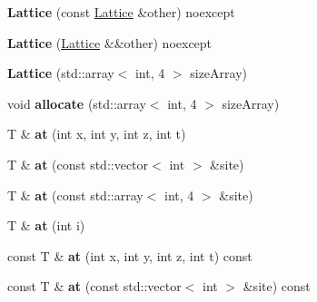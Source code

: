\begin{DoxyCompactItemize}
\item 
{\bfseries Lattice} (const \hyperlink{classLattice}{Lattice} \&other) noexcept\hypertarget{classLattice_a329f8bb4934a16dde20245e5aed1e0f2}{}\label{classLattice_a329f8bb4934a16dde20245e5aed1e0f2}

\item 
{\bfseries Lattice} (\hyperlink{classLattice}{Lattice} \&\&other) noexcept\hypertarget{classLattice_ac515062dd08174cfd300cb7ae82c1131}{}\label{classLattice_ac515062dd08174cfd300cb7ae82c1131}

\item 
{\bfseries Lattice} (std\+::array$<$ int, 4 $>$ size\+Array)\hypertarget{classLattice_a9583bced9172a01d6abb839dc1bea8a4}{}\label{classLattice_a9583bced9172a01d6abb839dc1bea8a4}

\item 
void {\bfseries allocate} (std\+::array$<$ int, 4 $>$ size\+Array)\hypertarget{classLattice_a34d4aba6e3440624d7a78f3de5604bbe}{}\label{classLattice_a34d4aba6e3440624d7a78f3de5604bbe}

\item 
T \& {\bfseries at} (int x, int y, int z, int t)\hypertarget{classLattice_a9345ef22de8cd40304ffaa24bbf84e57}{}\label{classLattice_a9345ef22de8cd40304ffaa24bbf84e57}

\item 
T \& {\bfseries at} (const std\+::vector$<$ int $>$ \&site)\hypertarget{classLattice_a505c50837cfcda18a1f26837ba487d1b}{}\label{classLattice_a505c50837cfcda18a1f26837ba487d1b}

\item 
T \& {\bfseries at} (const std\+::array$<$ int, 4 $>$ \&site)\hypertarget{classLattice_a2885da42d927704c9a465f31d4809302}{}\label{classLattice_a2885da42d927704c9a465f31d4809302}

\item 
T \& {\bfseries at} (int i)\hypertarget{classLattice_a7edbcfba94b2c85c8a73eef6c8b4969c}{}\label{classLattice_a7edbcfba94b2c85c8a73eef6c8b4969c}

\item 
const T \& {\bfseries at} (int x, int y, int z, int t) const \hypertarget{classLattice_a0f68df177d44035f352c097dc59d7b69}{}\label{classLattice_a0f68df177d44035f352c097dc59d7b69}

\item 
const T \& {\bfseries at} (const std\+::vector$<$ int $>$ \&site) const \hypertarget{classLattice_a75069863087489b2977074cd52ed8f73}{}\label{classLattice_a75069863087489b2977074cd52ed8f73}


\end{DoxyCompactItemize}
